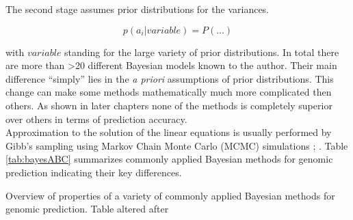 The second stage assumes prior distributions for the variances.

\begin{equation}
p(a_i| variable ) = P(\dots )
 \label{eqn:stagetwobayes}
\end{equation}

with $variable$ standing for the large variety of prior distributions. In total there are
more than >20 different Bayesian models known to the author. Their main difference
``simply'' lies in the \textit{a priori} assumptions of prior distributions. This change
can make some methods mathematically much more complicated then others. As shown in later
chapters none of the methods is completely superior over others in terms of
prediction accuracy. \\
Approximation to the solution of the linear equations is usually performed by Gibb's
sampling using Markov Chain Monte Carlo (MCMC) simulations \cite{dlc2009}; \cite{BGLR}.
Table \ref{tab:bayesABC} summarizes commonly applied Bayesian methods for genomic
prediction indicating their key differences.

\begin{table}[H]
\caption{Overview of properties of a variety of commonly applied Bayesian methods for genomic prediction. Table altered after \cite{karkkainen2012back}}
\label{tab:bayesABC}
\centering
{}
\caption*{The name is given by the author. The prior column tells which shrinkage prior is used. }
\end{table}


